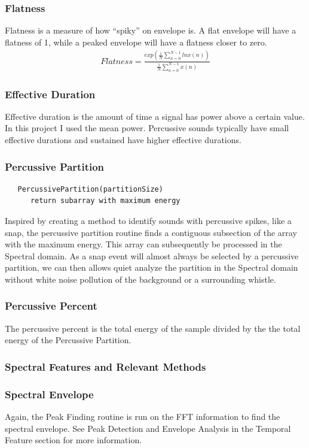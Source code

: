\documentclass[DIV=calc, paper=a4, fontsize=11pt, twocolumn]{scrartcl}   %
\begin{document}
   \subsubsection{Flatness}
      Flatness is a measure of how ``spiky'' on envelope is. A flat envelope will have a flatness of 1, while a peaked envelope will have a flatness closer to zero.
      \begin{align}
      Flatness = \frac{exp(\frac{1}{N}\sum_{n=0}^{N-1}lnx(n))}{\frac{1}{N}\sum_{n=0}^{N-1}x(n)}
      \end{align}
   \subsubsection{Effective Duration}
      Effective duration is the amount of time a signal has power above a certain value. In this project I used the mean power. Percussive sounds typically have small effective durations and sustained have higher effective durations.
   \subsubsection{Percussive Partition}
   \begin{lstlisting}
   PercussivePartition(partitionSize)
      return subarray with maximum energy
   \end{lstlisting}

   Inspired by creating a method to identify sounds with percussive spikes, like a snap, the percussive partition routine finds a contiguous subsection of the array with the maximum energy. This array can subsequently be processed in the Spectral domain. As a snap event will almost always be selected by a percussive partition, we can then allows quiet analyze the partition in the Spectral domain without white noise pollution of the background or a surrounding whistle.

   \subsubsection{Percussive Percent}
   The percussive percent is the total energy of the sample divided by the the total energy of the Percussive Partition.


\subsubsection{Spectral Features and Relevant Methods}
   \subsubsection{Spectral Envelope}
   Again, the Peak Finding routine is run on the FFT information to find the spectral envelope. See Peak Detection and Envelope Analysis in the Temporal Feature section for more information.
\end{document}
